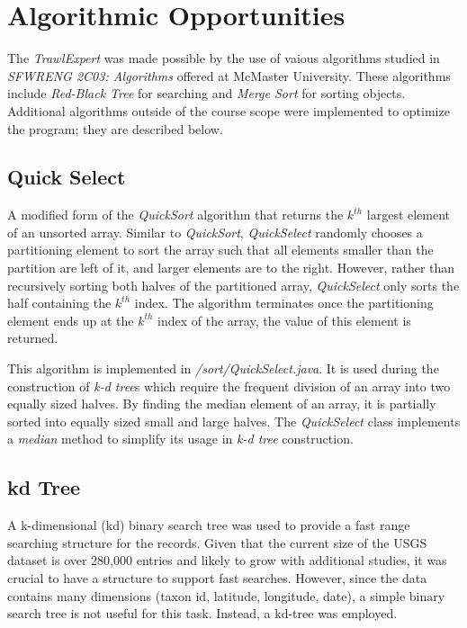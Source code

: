 \documentclass{article}
\begin{document}
\section{Algorithmic Opportunities}
The \textit{TrawlExpert} was made possible by the use of vaious algorithms studied in \textit{SFWRENG 2C03: Algorithms} offered at McMaster University. These algorithms include \textit{Red-Black Tree} for searching and \textit{Merge Sort} for sorting objects. Additional algorithms outside of the course scope were implemented to optimize the program; they are described below. 

\subsection{Quick Select}
A modified form of the \textit{QuickSort} algorithm that returns the $k^{th}$ largest element of an unsorted array. Similar to \textit{QuickSort}, \textit{QuickSelect} randomly chooses a partitioning element to sort the array such that all elements smaller than the partition are left of it, and larger elements are to the right. However, rather than recursively sorting both halves of the partitioned array, \textit{QuickSelect} only sorts the half containing the $k^{th}$ index. The algorithm terminates once the partitioning element ends up at the $k^{th}$ index of the array, the value of this element is returned.

This algorithm is implemented in \textit{/sort/QuickSelect.java}. It is used during the construction of \textit{k-d tree}s which require the frequent division of an array into two equally sized halves. By finding the median element of an array, it is partially sorted into equally sized small and large halves. The \textit{QuickSelect} class implements a \textit{median} method to simplify its usage in \textit{k-d tree} construction. 


\subsection{kd Tree}
A k-dimensional (kd) binary search tree was used to provide a fast range searching structure for the records. Given that the current size of the USGS dataset is over 280,000 entries and likely to grow with additional studies, it was crucial to have a structure to support fast searches. However, since the data contains many dimensions (taxon id, latitude, longitude, date), a simple binary search tree is not useful for this task. Instead, a kd-tree was employed.
\end{document}
